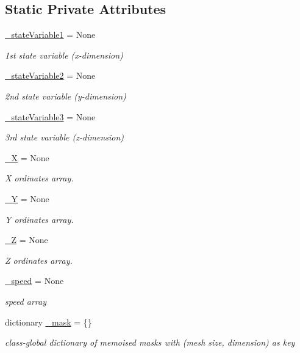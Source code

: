 \subsection*{Static Private Attributes}
\begin{DoxyCompactItemize}
\item 
\hyperlink{class_mu_mo_t_1_1_mu_mo_tfield_view_aa14fa36730691becc6f3136899545416}{\+\_\+state\+Variable1} = None
\begin{DoxyCompactList}\small\item\em 1st state variable (x-\/dimension) \end{DoxyCompactList}\item 
\hyperlink{class_mu_mo_t_1_1_mu_mo_tfield_view_a9d3705d1d9182e10751ff693573d6d16}{\+\_\+state\+Variable2} = None
\begin{DoxyCompactList}\small\item\em 2nd state variable (y-\/dimension) \end{DoxyCompactList}\item 
\hyperlink{class_mu_mo_t_1_1_mu_mo_tfield_view_ad2f8dc44173a16468bd9d3ab335f9b27}{\+\_\+state\+Variable3} = None
\begin{DoxyCompactList}\small\item\em 3rd state variable (z-\/dimension) \end{DoxyCompactList}\item 
\hyperlink{class_mu_mo_t_1_1_mu_mo_tfield_view_abb529af75494ab2513e57b8434c7c975}{\+\_\+X} = None
\begin{DoxyCompactList}\small\item\em X ordinates array. \end{DoxyCompactList}\item 
\hyperlink{class_mu_mo_t_1_1_mu_mo_tfield_view_a17bd9f55d983ee8d5a6f22088d0397e8}{\+\_\+Y} = None
\begin{DoxyCompactList}\small\item\em Y ordinates array. \end{DoxyCompactList}\item 
\hyperlink{class_mu_mo_t_1_1_mu_mo_tfield_view_a7b96cbb62a4ad08851fa147958f0d6e4}{\+\_\+Z} = None
\begin{DoxyCompactList}\small\item\em Z ordinates array. \end{DoxyCompactList}\item 
\hyperlink{class_mu_mo_t_1_1_mu_mo_tfield_view_a3293b40663039bb46c8c977a9948436e}{\+\_\+speed} = None
\begin{DoxyCompactList}\small\item\em speed array \end{DoxyCompactList}\item 
dictionary \hyperlink{class_mu_mo_t_1_1_mu_mo_tfield_view_acbf4bc8fa26c3cf9e1d2741cc3dea058}{\+\_\+mask} = \{\}
\begin{DoxyCompactList}\small\item\em class-\/global dictionary of memoised masks with (mesh size, dimension) as key \end{DoxyCompactList}\end{DoxyCompactItemize}
